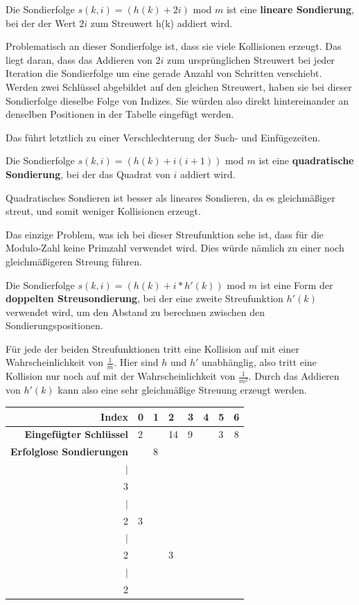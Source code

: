 \newpage


\begin{aufgabe}
\begin{teile}
	\item
	Die Sondierfolge $s(k, i) = (h(k) + 2i)$ mod $m$ ist eine \textbf{lineare Sondierung}, bei der der Wert $2i$ zum Streuwert h(k) addiert wird. 
	
	Problematisch an dieser Sondierfolge ist, dass sie viele Kollisionen erzeugt. Das liegt daran, dass das Addieren von $2i$ zum ursprünglichen Streuwert bei jeder Iteration die Sondierfolge um eine gerade Anzahl von Schritten verschiebt. Werden zwei Schlüssel abgebildet auf den gleichen Streuwert, haben sie bei dieser Sondierfolge dieselbe Folge von Indizes. Sie würden also direkt hintereinander an denselben Positionen in der Tabelle eingefügt werden. 
	
	Das führt letztlich zu einer Verschlechterung der Such- und Einfügezeiten. \\
	
	
	\item
	Die Sondierfolge $s(k,i) = (h(k) + i(i+1))$ mod $m$ ist eine \textbf{quadratische Sondierung}, bei der das Quadrat von $i$ addiert wird. 
	
	Quadratisches Sondieren ist besser als lineares Sondieren, da es gleichmäßiger streut, und somit weniger Kollisionen erzeugt. 
	
	Das einzige Problem, was ich bei dieser Streufunktion sehe ist, dass für die Modulo-Zahl keine Primzahl verwendet wird. Dies würde nämlich zu einer noch gleichmäßigeren Streung führen. \\

	\item
	Die Sondierfolge $s(k, i) = (h(k) + i * h'(k))$ mod $m$ ist eine Form der \textbf{doppelten Streusondierung}, bei der eine zweite Streufunktion $h'(k)$ verwendet wird, um den Abstand zu berechnen zwischen den Sondierungspositionen. 
	
	Für jede der beiden Streufunktionen tritt eine Kollision auf mit einer Wahrscheinlichkeit von $\frac{1}{m}$. Hier sind $h$ und $h'$ unabhänglig, also tritt eine Kollision nur noch auf mit der Wahrscheinlichkeit von $\frac{1}{m^2}$. Durch das Addieren von $h'(k)$ kann also eine sehr gleichmäßige Streuung erzeugt werden. \\
	

	\item
	\begin{tabular}[t]{r|X|X|X|X|X|X|c}
	\textbf{Index} & 0 & 1 & 2 & 3 & 4 & 5 & 6 \\
	\hline
	\textbf{Eingefügter Schlüssel} & 2 & & 14 & 9 & & 3 & 8 \\
	\hline
	\textbf{Erfolglose Sondierungen} & & 8 \\ $\vert$ \\ 3 \\ $\vert$ \\ 2 & 3 \\ $\vert$ \\ 2 &  &  & 3 \\ $\vert$ \\ 2 
	\end{tabular}
	

\end{teile}
\end{aufgabe}
